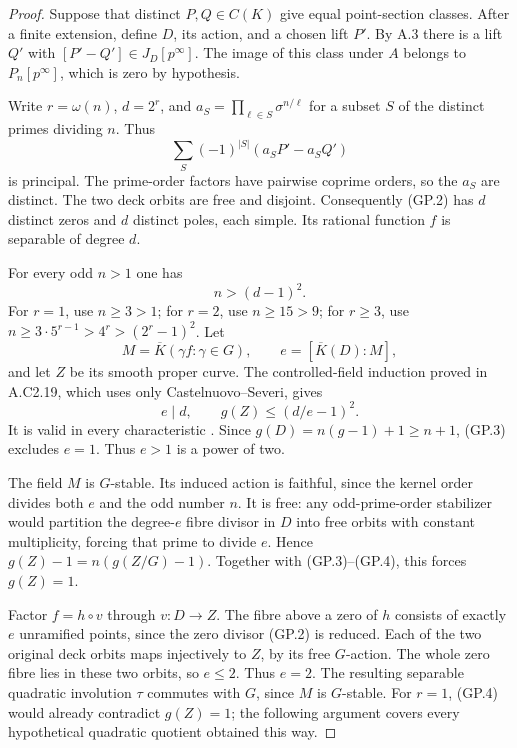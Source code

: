 \begin{proof}
Suppose that distinct $P,Q\in C(K)$ give equal
point-section classes. After a finite extension,
define $D$, its action, and a chosen lift $P'$.
By A.3 there is a lift $Q'$ with
$[P'-Q']\in J_D[p^\infty]$.
The image of this class under $A$ belongs to
$P_n[p^\infty]$, which is zero by hypothesis.

Write $r=\omega(n)$, $d=2^r$, and
$a_S=\prod_{\ell\in S}\sigma^{n/\ell}$ for a
subset $S$ of the distinct primes dividing $n$.
Thus
\[
                 \sum_S(-1)^{|S|}(a_SP'-a_SQ')            \tag{GP.2}
\]
is principal. The prime-order factors have
pairwise coprime orders, so the $a_S$ are distinct.
The two deck orbits are free and disjoint.
Consequently (GP.2) has $d$ distinct zeros and
$d$ distinct poles, each simple. Its rational
function $f$ is separable of degree $d$.

For every odd $n>1$ one has
\[
                              n>(d-1)^2.                 \tag{GP.3}
\]
For $r=1$, use $n\ge3>1$; for $r=2$, use
$n\ge15>9$; for $r\ge3$, use
$n\ge3\cdot5^{r-1}>4^r>(2^r-1)^2$.
Let
\[
 M=\overline K(\gamma f:\gamma\in G),\qquad
                    e=[\overline K(D):M],
\]
and let $Z$ be its smooth proper curve.
The controlled-field induction proved in A.C2.19,
which uses only Castelnuovo--Severi, gives
\[
                       e\mid d,\qquad
                       g(Z)\le(d/e-1)^2.                 \tag{GP.4}
\]
It is valid in every characteristic
\citep[Proposition 2.1, Lemma 2.2 and Corollary 2.3,
author p.~3]{A_PrimPoonen2007}.
Since $g(D)=n(g-1)+1\ge n+1$, (GP.3) excludes
$e=1$. Thus $e>1$ is a power of two.

The field $M$ is $G$-stable. Its induced action
is faithful, since the kernel order divides both
$e$ and the odd number $n$. It is free: any
odd-prime-order stabilizer would partition the
degree-$e$ fibre divisor in $D$ into free orbits
with constant multiplicity, forcing that prime
to divide $e$.
Hence $g(Z)-1=n(g(Z/G)-1)$. Together with
(GP.3)--(GP.4), this forces $g(Z)=1$.

Factor $f=h\circ v$ through $v:D\to Z$.
The fibre above a zero of $h$ consists of
exactly $e$ unramified points, since the zero
divisor (GP.2) is reduced. Each of the two
original deck orbits maps injectively to $Z$,
by its free $G$-action. The whole zero fibre
lies in these two orbits, so $e\le2$. Thus
$e=2$. The resulting separable quadratic
involution $\tau$ commutes with $G$, since
$M$ is $G$-stable. For $r=1$, (GP.4) would
already contradict $g(Z)=1$; the following
argument covers every hypothetical quadratic
quotient obtained this way.


\end{proof}
